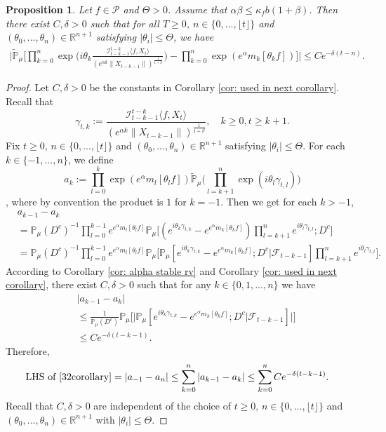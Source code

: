 \documentclass[12pt]{amsart}
\theoremstyle{plain}
\newtheorem{prop}[thm]{Proposition}
\theoremstyle{definition}
\numberwithin{equation}{section}
\begin{document}
\begin{prop}\label{corollary31}
Let $f\in \mathcal{P}$ and $\Theta>0$. Assume that $\alpha\beta\leq\kappa_fb(1+\beta)$. Then there exist $C,\delta>0$ such that for all $T\geq 0$, $n \in \{0,...,\lfloor t \rfloor\}$ and $(\theta_0,...,\theta_n)\in \mathbb{R}^{n+1}$ satisfying $|\theta_i|\leq \Theta$, we have
\begin{align}
\label{32corollary}
    \Big|\mathbb{\tilde{P}}_{\mu}\Big[\prod_{k=0}^n\exp\Big(i\theta_k \frac {\mathcal I_{t-k-1}^{t-k}\langle f ,X_t\rangle}{(e^{\alpha k}\|X_{t-k-1}\|)^\frac{1}{1+\beta}}\Big)-\prod_{k=0}^n\exp(e^{\alpha}m_k[\theta_k f])\Big]\Big|\leq C e^{-\delta(t-n)}.
\end{align}
\end{prop}
\begin{proof}
	Let $C,\delta > 0$ be the constants in Corollary \ref{cor: used in next corollary}.
    Recall that \[\gamma_{t,k}:=\frac {\mathcal I_{t-k-1}^{t-k}\langle f ,X_t\rangle}{(e^{\alpha k}\|X_{t-k-1}\|)^\frac{1}{1+\beta}},\quad k \geq 0, t\geq k+1. \]
    Fix $t\geq 0$, $n \in \{0,...,\lfloor t \rfloor\}$ and $(\theta_0,...,\theta_n)\in \mathbb{R}^{n+1}$ satisfying $|\theta_i|\leq \Theta$.
    For each $k\in\{-1,...,n\}$, we define
    \[a_k:=\prod_{l=0}^{k}\exp(e^{\alpha}m_l[\theta_lf])\mathbb{\tilde{P}}_{\mu}\Big(\prod_{l=k+1}^{n}\exp\left(i\theta_l\gamma_{t,l}\right)\Big)\],
     where by convention the product is $1$ for $k=-1$. Then we get for each $k > -1$,
    \begin{align*}
        &a_{k-1} - a_k
        \\&=\mathbb{P}_{\mu}(D^c)^{-1}\prod_{l=0}^{k-1}e^{e^{\alpha}m_l[\theta_l f]}\mathbb{P}_{\mu}\Big[(e^{i\theta_{k}\gamma_{t,k}}-e^{e^{\alpha}m_k[\theta_k f]})\prod_{l=k+1}^ne^{i\theta_{l}\gamma_{t,l}};D^c\Big]
        \\&=\mathbb{P}_{\mu}(D^c)^{-1}\prod_{l=0}^{k-1}e^{e^{\alpha}m_l[\theta_l f]}\mathbb{P}_{\mu}\Big[\mathbb P_\mu[e^{i\theta_{k}\gamma_{t,k}}-e^{e^{\alpha}m_k[\theta_k f]}; D^c|\mathscr F_{t-k-1}]\prod_{l=k+1}^ne^{i\theta_{l}\gamma_{t,l}}\Big].
    \end{align*}
    According to Corollary \ref{cor: alpha stable rv} and Corollary \ref{cor: used in next corollary}, there exist $C,\delta>0$ such that for any $k\in\{0,1,...,n\}$ we have
    \begin{align*}
        &|a_{k-1}- a_k|
        \\&\leq \frac{1}{\mathbb{P}_{\mu}(D^c)}\mathbb{P}_{\mu}\Big[\big|\mathbb P_\mu[e^{i\theta_{k}\gamma_{t,k}}-e^{e^{\alpha}m_k[\theta_k f]}; D^c\big|\mathscr{F}_{t-k-1}]\big|\Big]
        \\& \leq C e^{-\delta(t-k-1)}.
    \end{align*}
Therefore,
\begin{align}
    \text{LHS of \eqref{32corollary}}&= \left|a_{-1}-a_n\right|
    \leq\sum_{k=0}^n\left|a_{k-1}-a_k\right|
    \leq \sum_{k=0}^n C e^{-\delta(t-k-1)}.
\end{align}
	Recall that $C, \delta>0$ are independent of the choice of $t\geq 0$, $n \in \{0,...,\lfloor t \rfloor\}$ and $(\theta_0,...,\theta_n)\in \mathbb{R}^{n+1}$ with $|\theta_i|\leq \Theta$.
\end{proof}
\end{document}
